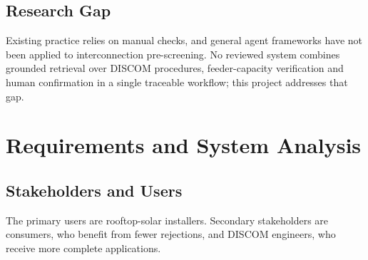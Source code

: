 \documentclass[12pt,a4paper,oneside]{report}
\newif\ifguidance
\newcommand{\guide}[1]{%
  \ifguidance
  \begin{tcolorbox}[enhanced,breakable,colback=guidebg,colframe=bmsblue,
    boxrule=0.6pt,arc=2pt,left=6pt,right=6pt,top=4pt,bottom=4pt,
    fonttitle=\bfseries\small,title={What to write here},
    before upper={\small\setstretch{1.1}}]
  #1
  \end{tcolorbox}
  \fi}
\newcommand{\dodont}[2]{%
  \ifguidance
  \begin{tcolorbox}[enhanced,breakable,sidebyside,sidebyside align=top seam,
    colback=dobg,colbacklower=dontbg,colframe=gray!60,boxrule=0.5pt,arc=2pt,
    lefthand ratio=0.5,left=5pt,right=5pt,top=4pt,bottom=4pt,
    fontupper=\small\setstretch{1.05},fontlower=\small\setstretch{1.05}]
  \textbf{\textcolor{ForestGreen}{\checkmark\ Do}}
  \begin{itemize}[leftmargin=12pt,itemsep=1pt,topsep=2pt]#1\end{itemize}
  \tcblower
  \textbf{\textcolor{BrickRed}{$\times$ Don't}}
  \begin{itemize}[leftmargin=12pt,itemsep=1pt,topsep=2pt]#2\end{itemize}
  \end{tcolorbox}
  \fi}
\newcommand{\pagebudget}[1]{%
  \ifguidance\noindent{\small\textcolor{bmsblue}{\textbf{Expected length:} #1 pages}}\par\medskip\fi}
\newenvironment{sample}
  {\par\noindent{\footnotesize\bfseries\textcolor{BrickRed}{[SAMPLE --- replace with your own content]}}\par\color{samplecol}}
  {\par\medskip}
\begin{document}
\section{Research Gap}
\guide{Two or three sentences that follow directly from the table: what is missing, and how your
project addresses it.}
\dodont{\item Derive the gap from the works you reviewed.}
{\item Do not claim that ``no work exists'' unless you have searched thoroughly.}
\begin{sample}
Existing practice relies on manual checks, and general agent frameworks have not been applied to
interconnection pre-screening. No reviewed system combines grounded retrieval over DISCOM procedures,
feeder-capacity verification and human confirmation in a single traceable workflow; this project
addresses that gap.
\end{sample}

\chapter{Requirements and System Analysis}
\pagebudget{3--4}
\guide{Translate the problem into concrete requirements that the design in Chapter~4 must satisfy
and the evaluation in Chapter~7 must test.}

\section{Stakeholders and Users}
\guide{Identify who uses the system, who is affected by its output, and what each needs from it.}
\dodont{\item Name real roles in the sector.
}
{\item Do not write ``all users'' or ``everyone''.
}

\begin{sample}
The primary users are rooftop-solar installers. Secondary stakeholders are consumers, who benefit from
fewer rejections, and DISCOM engineers, who receive more complete applications.
\end{sample}
\end{document}
